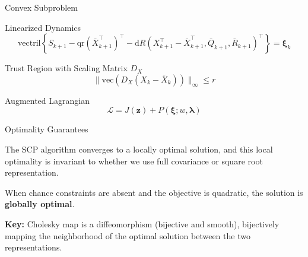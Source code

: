 \documentclass{beamer}
\begin{document}
\begin{frame}{Convex Subproblem}
\begin{block}{Linearized Dynamics}
\[
\mathrm{vectril} \left\{ S_{k+1} - \mathrm{qr}(\bar{X}_{k+1}^\top)^\top - \mathrm{d} R(X_{k+1}^\top - \bar{X}_{k+1}^\top, \bar{Q}_{k+1}, \bar{R}_{k+1})^\top \right\} = \boldsymbol{\xi}_k
\]
\end{block}

\begin{block}{Trust Region with Scaling Matrix $D_X$}
\[
\lVert\mathrm{vec}(D_X(X_k - \bar{X}_k))\rVert_\infty \leq r
\]
\end{block}

\begin{block}{Augmented Lagrangian}
\[
\mathcal{L} = J(\boldsymbol{z}) + P(\boldsymbol{\xi}; w, \boldsymbol{\lambda})
\]
\end{block}
\end{frame}


\begin{frame}{Optimality Guarantees}
\begin{theorem}
The SCP algorithm converges to a locally optimal solution, and this local optimality is invariant to whether we use full covariance or square root representation.
\end{theorem}

\begin{theorem}
When chance constraints are absent and the objective is quadratic, the solution is \textbf{globally optimal}.
\end{theorem}

\vspace{0.3cm}
\textbf{Key:} Cholesky map is a diffeomorphism (bijective and smooth), bijectively mapping the neighborhood of the optimal solution between the two representations.
\end{frame}

\end{document}
